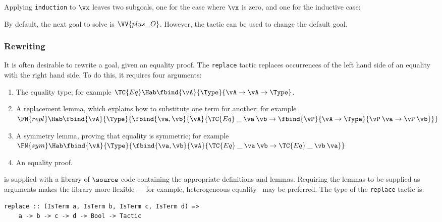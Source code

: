 
Applying \texttt{induction} to $\vx$ leaves two subgoals, one for the
case where $\vx$ is zero, and one for the inductive case:


By default, the next goal to solve is $\VV{plus\_O}$. However, the
 tactic can be used to change the default goal.

\subsubsection{Rewriting}

It is often desirable to rewrite a goal, given an equality proof. The
\texttt{replace} tactic replaces occurrences of the left hand side of
an equality with the right hand side. To do this, it requires four
arguments:

\begin{enumerate}
\item The equality type; for example
  $\TC{Eq}\Hab\fbind{\vA}{\Type}{\vA\to\vA\to\Type}$.
\item A replacement lemma, which explains how to substitute one term
  for another; for example\\
  $\FN{repl}\Hab\fbind{\vA}{\Type}{
    \fbind{\va,\vb}{\vA}{
	\TC{Eq}\:\_\:\va\:\vb\to\fbind{\vP}{\vA\to\Type}{
	  \vP\:\va\to\vP\:\vb}}}$
\item A symmetry lemma, proving that equality is symmetric; for
  example\\
  $\FN{sym}\Hab\fbind{\vA}{\Type}{
      \fbind{\va,\vb}{\vA}{\TC{Eq}\:\_\:\va\:\vb\to\TC{Eq}\:\_\:\vb\:\va}}$
\item An equality proof.
\end{enumerate}

\Ivor{} is supplied with a library of $\source$ code containing the
appropriate definitions and lemmas. Requiring the lemmas to be
supplied as arguments makes the library more flexible --- for
example, heterogeneous equality~\cite{mcbride-thesis} may be
preferred.  The type of the \texttt{replace} tactic is:

\begin{verbatim}
replace :: (IsTerm a, IsTerm b, IsTerm c, IsTerm d) =>
    a -> b -> c -> d -> Bool -> Tactic
\end{verbatim}

